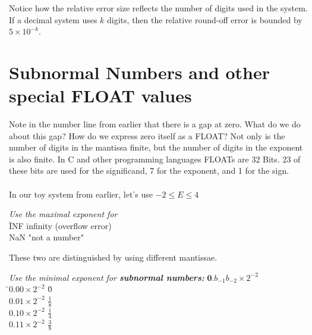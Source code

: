 \documentclass[a4paper,12pt]{report}
\begin{document}
	Notice how the relative error size reflects the number of digits used in the system. If a decimal 
	system uses $k$ digits, then the relative round-off error is bounded by $5 \times 10^{-k}$.\\


\section{Subnormal Numbers and other special FLOAT values}

	Note in the number line from earlier that there is a gap at zero.  What do we do about this gap?  
	How do we express zero itself as a FLOAT? Not only is the number of digits in the mantissa finite, 
	but the number of digits in the exponent is also finite. In C and other programming languages 
	FLOATs are 32 Bits.  23 of these bits are used for the significand, 7 for the exponent, and 1 for the 
	sign.\\ \\

	In our toy system from earlier, let's use $-2\leq  E \leq 4$
	
\begin{tabbing}
	\hspace*{2cm}\= \textit{Use the maximal exponent for} \\
	\hspace*{3cm}\=INF \hspace*{1cm} \=  infinity (overflow error)\\
	\> NaN \> "not a number"
\end{tabbing}

	These two are distinguished by using different mantissae.

\begin{tabbing}
	\hspace*{2cm}\= \textit{Use the minimal exponent for \textbf{subnormal numbers:}}
		$\textbf{0}.b_{-1}b_{-2}\times 2^{-2}$ \\
	\hspace*{3cm}\=$0.00\times 2^{-2}$ \hspace*{1cm} \=  0\\
	\>$0.01\times 2^{-2}$ \>$\frac{1}{8}$\\
	\>$0.10\times 2^{-2}$ \>$\frac{1}{4}$\\
	\>$0.11\times 2^{-2}$ \>$\frac{3}{8}$\\
\end{tabbing}
\end{document}
